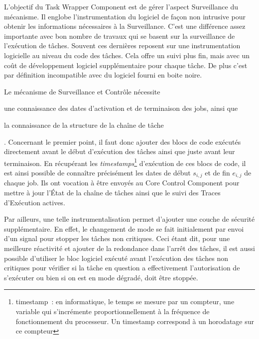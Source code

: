 \documentclass[french, a4paper, 11pt, twoside, pdftex]{StyleThese}
\begin{document}
        L'objectif du Task Wrapper Component est de gérer l'aspect Surveillance du mécanisme. Il englobe l'instrumentation du logiciel de façon non intrusive pour obtenir les informations nécessaires à la Surveillance. C'est une différence assez importante avec bon nombre de travaux qui se basent sur la surveillance de l'exécution de tâches. Souvent ces dernières reposent sur une instrumentation logicielle au niveau du code des tâches. Cela offre un suivi plus fin, mais avec un coût de développement logiciel supplémentaire pour chaque tâche. De plus c'est par définition incompatible avec du logiciel fourni en boite noire.
        
        Le mécanisme de Surveillance et Contrôle nécessite \begin{enumerate*}[label=\bfseries\alph*)]
        	\item une connaissance des dates d'activation et de terminaison des jobs, ainsi que 
        	\item la connaissance de la structure de la chaîne de tâche
        \end{enumerate*}. Concernant le premier point, il faut donc ajouter des blocs de code exécutés directement avant le début d'exécution des tâches ainsi que juste avant leur terminaison. En récupérant les \textit{timestamps}\footnote{timestamp~: en informatique, le temps se mesure par un compteur, une variable qui s'incrémente proportionnellement à la fréquence de fonctionnement du processeur. Un timestamp correspond à un horodatage sur ce compteur} d'exécution de ces blocs de code, il est ainsi possible de connaître précisément les dates de début $s_{i,j}$ et de fin $e_{i,j}$ de chaque job. Ils ont vocation à être envoyés au Core Control Component pour mettre à jour l'État de la chaîne de tâches ainsi que le suivi des Traces d'Exécution actives.
        
        Par ailleurs, une telle instrumentalisation permet d'ajouter une couche de sécurité supplémentaire. En effet, le changement de mode se fait initialement par envoi d'un signal pour stopper les tâches non critiques. Ceci étant dit, pour une meilleure réactivité et ajouter de la redondance dans l'arrêt des tâches, il est aussi possible d'utiliser le bloc logiciel exécuté avant l'exécution des tâches non critiques pour vérifier si la tâche en question a effectivement l'autorisation de s'exécuter ou bien si on est en mode dégradé, doit être stoppée. 
        
\end{document}
